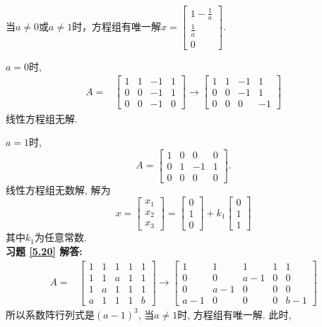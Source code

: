 \documentclass[a4paper]{book}
\begin{document}
当$a\not=0$或$a\not=1$时，方程组有唯一解$x=\begin{bmatrix}1-\frac{1}{a}\\ \frac{1}{a}\\0\end{bmatrix}.$

$a=0$时,
 \begin{displaymath}
\begin{aligned}
A=&\begin{bmatrix} 1&1&-1&1\\0&0&-1&1\\0&0&-1&0  \end{bmatrix}\rightarrow
\begin{bmatrix} 1&1&-1&1\\0&0&-1&1\\0&0&0&-1  \end{bmatrix}\end{aligned} \end{displaymath}
线性方程组无解.

$a=1$时,$$A=\begin{bmatrix}1&0&0&0\\0&1&-1&1\\0&0&0&0\end{bmatrix}.$$
线性方程组无数解, 解为
\begin{displaymath}
x=\begin{bmatrix}x_1\\x_2\\x_3\end{bmatrix}=\begin{bmatrix}0\\1\\0\end{bmatrix}+k_1
\begin{bmatrix}0\\1\\1\end{bmatrix}\end{displaymath}
其中$k_1$为任意常数.\\
\textbf{习题 \ref{5.20} 解答:}\\
 \begin{displaymath}
\begin{aligned}
A=&\begin{bmatrix} 1&1&1&1&1\\1&1&a&1&1\\1&a&1&1&1\\a&1&1&1&b \end{bmatrix}\rightarrow
\begin{bmatrix} 1&1&1&1&1\\0&0&a-1&0&0\\0&a-1&0&0&0\\a-1&0&0&0&b-1 \end{bmatrix}\end{aligned} \end{displaymath}
所以系数阵行列式是$(a-1)^3$, 当$a\not=1$时, 方程组有唯一解. 此时,
\end{document}
